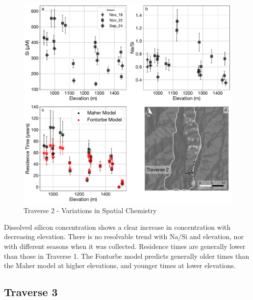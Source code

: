 \begin{figure}[h]
    \centering
        \includegraphics[width=\textwidth]{Traverse_2_summary.pdf}
    \caption{Traverse 2 - Variations in Spatial Chemistry}
    \label{fig:spatial_changes_spring2}
\end{figure}

\FloatBarrier

Dissolved silicon concentration shows a clear increase in concentration with decreasing elevation. There is no resolvable trend with Na/Si and elevation, nor with different seasons when it was collected. Residence times are generally lower than those in Traverse 1. The Fontorbe model predicts generally older times than the Maher model at higher elevations, and younger times at lower elevations. 




\newpage

\subsection{Traverse 3}

